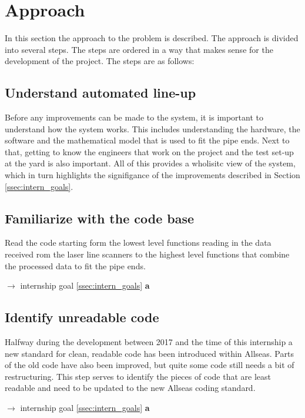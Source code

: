 \section{Approach} \label{sec:approach}
In this section the approach to the problem is described. The approach is divided into several steps.
The steps are ordered in a way that makes sense for the development of the project. The steps are as follows:

\subsection{Understand automated line-up} \label{ssec:understand_lua}
Before any improvements can be made to the system, it is important to understand how the system works.
This includes understanding the hardware, the software and the mathematical model that is used to fit the pipe ends.
Next to that, getting to know the engineers that work on the project and the test set-up at the yard is also important.
All of this provides a wholisitc view of the system, which in turn highlights the signifigance of the improvements described
in Section \ref{ssec:intern_goals}.

\subsection{Familiarize with the code base} \label{ssec:familiarize_code}
Read the code starting form the lowest level functions reading in the data received rom the laser line scanners to
the highest level functions that combine the processed data to fit the pipe ends.
\begin{flushright}
    $\rightarrow$ internship goal \ref{ssec:intern_goals} \textbf{a}
\end{flushright}

\subsection{Identify unreadable code} \label{ssec:unreadable_code}
Halfway during the development between 2017 and the time of this internship a new standard for clean, readable code has been
introduced within Allseas. Parts of the old code have also been improved, but quite some code still needs a bit of restructuring.
This step serves to identify the pieces of code that are least readable and need to be updated to the new Allseas coding standard.
\begin{flushright}
    $\rightarrow$ internship goal \ref{ssec:intern_goals} \textbf{a}
\end{flushright}

